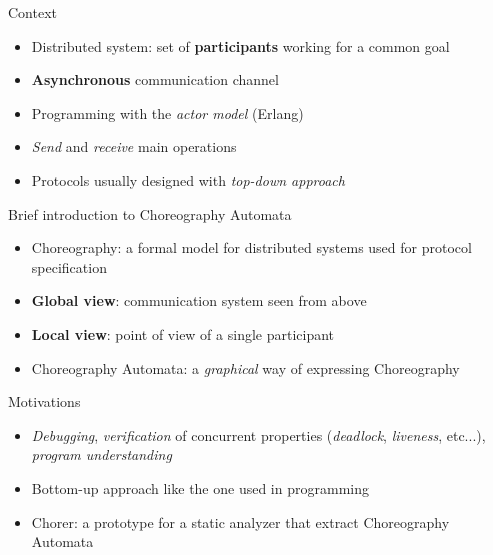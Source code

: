 \documentclass{beamer}
\begin{document}
\begin{frame}{Context}
\begin{itemize}
    \item Distributed system: set of \textbf{participants} working for a  
    common goal
    \bigskip
    \item \textbf{Asynchronous} communication channel
    \bigskip
    \item Programming with the \textit{actor model} (Erlang)
    \bigskip
    \item \textit{Send} and \textit{receive} main operations
    \bigskip
    \item Protocols usually designed with \textit{top-down approach} 
\end{itemize}
    
\end{frame}

\begin{frame}{Brief introduction to Choreography Automata}

\begin{itemize}
    \item Choreography: a formal model for distributed systems used
    for protocol specification
    \bigskip
    \item \textbf{Global view}: communication system seen from above
    \bigskip
    \item \textbf{Local view}: point of view of a single participant
    \bigskip
    \item Choreography Automata: a \textit{graphical} way of expressing Choreography
\end{itemize}
\end{frame}

\begin{frame}{Motivations}
\begin{itemize}
    \item \textit{Debugging}, \textit{verification} of 
    concurrent properties (\textit{deadlock}, \textit{liveness}, etc...), 
    \textit{program understanding}
    \bigskip
    \item Bottom-up approach like the one used in programming
    \bigskip
    \item Chorer: a prototype for a static analyzer that extract Choreography Automata
\end{itemize}
\end{frame}
\end{document}
